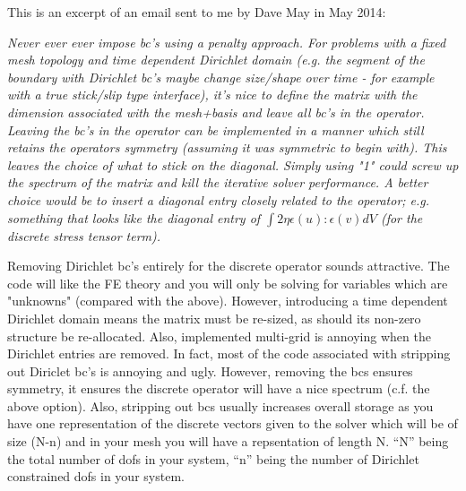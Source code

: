  This is an excerpt of an email sent to me by Dave May in May 2014: 
{\it 
Never ever ever impose bc's using a penalty approach.
For problems with a fixed mesh topology and time dependent Dirichlet domain (e.g. the segment 
of the boundary with Dirichlet bc's 
maybe change size/shape over time - for example with a true stick/slip type interface), it's nice to define the matrix 
with the dimension associated with the mesh+basis and leave all bc's in the operator. 
Leaving the bc's in the operator can be implemented in a manner which still retains the operators symmetry (assuming 
it was symmetric to begin with). This leaves the choice of what to stick on the diagonal. Simply using "1" could 
screw up the spectrum of the matrix and kill the iterative solver performance. A better choice would be to insert 
a diagonal entry closely related to the operator; e.g. something that looks like the diagonal entry 
of $\int 2 \eta \epsilon(u) : \epsilon(v) dV$ (for the discrete stress tensor term). 

Removing Dirichlet bc's entirely for the discrete operator sounds attractive. The code will like the FE theory 
and you will only be solving for variables which are "unknowns" (compared with the above). 
However, introducing a time dependent Dirichlet domain means the matrix must be re-sized, as should its non-zero structure 
be re-allocated. Also, implemented multi-grid is annoying when the Dirichlet entries are removed. In fact, most of  
the code associated with stripping out Diriclet bc's is annoying and ugly. However, removing the bcs ensures symmetry, 
it ensures the discrete operator will have a nice spectrum (c.f. the above option). Also, stripping out bcs usually 
increases overall storage as you have one representation of the discrete vectors given to the solver which will be  
of size (N-n) and in your mesh you will have a repsentation of length N. ``N'' being the total number of dofs in your 
system, ``n'' being the number of Dirichlet constrained dofs in your system. }
 
